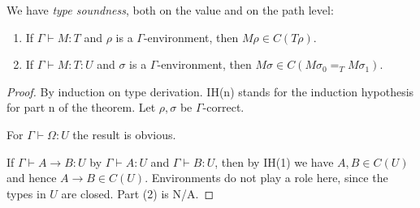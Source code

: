 \documentclass[10pt,a4paper]{article}
\begin{document}
\begin{theorem}\label{typesoundness}
We have \emph{type soundness}, both on the value and on the path level:
\begin{enumerate}
\item If $\Gamma\vdash M:T$ and $\rho$ is a $\Gamma$-environment, then $M\rho\in C(T\rho)$.
\item If $\Gamma\vdash M:T:U$ and $\sigma$ is a $\Gamma$-environment, 
then $M\sigma\in C(M \sigma_0 =_T M \sigma_1)$.
\end{enumerate}
\end{theorem}
\begin{proof}
By induction on type derivation.
IH(n) stands for the induction hypothesis for part n of the theorem.
Let $\rho,\sigma$ be $\Gamma$-correct.

For $\Gamma\vdash\Omega:U$ the result is obvious.

If $\Gamma\vdash {A}\to{B} :U$  by $\Gamma\vdash A:U$ and $\Gamma\vdash B:U$,
then by IH(1) we have $A,B\in C(U)$ and hence $A{\to}B\in C(U)$.
Environments do not play a role here, since the types in $U$ are closed.
Part (2) is N/A.


\end{proof}
\end{document}
